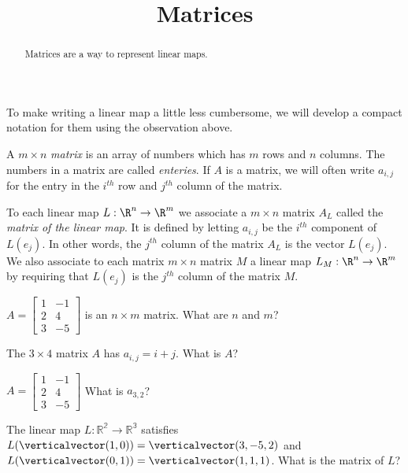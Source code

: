 \documentclass{article}
\title{Matrices}
\begin{document}
\begin{abstract}
  Matrices are a way to represent linear maps.
\end{abstract}

To make writing a linear map a little less cumbersome, we will develop
a compact notation for them using the observation above.

\begin{definition}
  A $m \times n$ \textit{matrix} is an array of numbers which has $m$ rows and $n$ columns.  The numbers in a matrix are called \textit{enteries}. If $A$ is a matrix, 
  we will often write $a_{i,j}$ for the entry in the $i^{th}$  row and $j^{th}$ column of the matrix.
\end{definition}
	
\begin{definition}
  To each linear map $L: \R^n \to \R^m$  we associate a $m \times n$ matrix $A_L$ called the \textit{matrix of the linear map}.  It is defined 
  by letting $a_{i,j}$ be the $i^{th}$ component of $L(e_j)$.  In other words, the $j^{th}$ column of the matrix $A_L$ is the vector $L(e_j)$.  We also associate to each 
  matrix $m \times n$ matrix $M$ a linear map $L_M: \R^n \to \R^m$ by requiring that $L(e_j)$ is the $j^{th}$ column of the matrix $M$. 
\end{definition}

\begin{question}
  $A = \begin{bmatrix}
    1&-1\\2&4\\3&-5
  \end{bmatrix}$
  is an $n \times m$ matrix.  What are $n$ and $m$? 
\end{question}

\begin{question}
  The $3 \times 4$ matrix $A$ has $a_{i,j} = i+j$.  What is $A$?
\end{question}

\begin{question}
  $A = \begin{bmatrix}
    1&-1\\2&4\\3&-5
  \end{bmatrix}$
  What is $a_{3,2}$?
\end{question}
	
\begin{question}
  The linear map $L:\mathbb{R^2}\to\mathbb{R^3}$ satisfies $L(\verticalvector(1,0)) = \verticalvector(3,-5,2)$ and $L(\verticalvector(0,1)) = \verticalvector(1,1,1)$. 
  What is the matrix of $L$?
\end{question}
	
\end{document}
